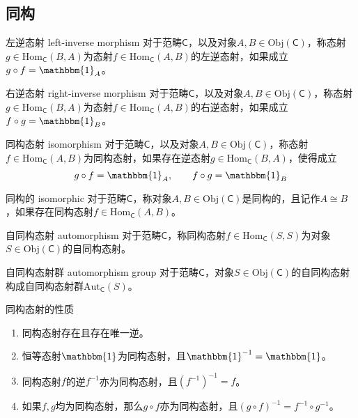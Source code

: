 \subsection{同构}

\begin{definition}{左逆态射 left-inverse morphism}
	对于范畴$\mathsf{C}$，以及对象$A,B\in\mathrm{Obj}(\mathsf{C})$，称态射$g\in\mathrm{Hom}_\mathsf{C}(B,A)$为态射$f\in\mathrm{Hom}_\mathsf{C}(A,B)$的左逆态射，如果成立$g\circ f=\mathbbm{1}_A$。
\end{definition}

\begin{definition}{右逆态射 right-inverse morphism}
	对于范畴$\mathsf{C}$，以及对象$A,B\in\mathrm{Obj}(\mathsf{C})$，称态射$g\in\mathrm{Hom}_\mathsf{C}(B,A)$为态射$f\in\mathrm{Hom}_\mathsf{C}(A,B)$的右逆态射，如果成立$f\circ g=\mathbbm{1}_B$。
\end{definition}

\begin{definition}{同构态射 isomorphism}
	对于范畴$\mathsf{C}$，以及对象$A,B\in\mathrm{Obj}(\mathsf{C})$，称态射$f\in\mathrm{Hom}_\mathsf{C}(A,B)$为同构态射，如果存在逆态射$g\in\mathrm{Hom}_\mathsf{C}(B,A)$，使得成立
	$$
	g\circ f=\mathbbm{1}_A,\qquad f\circ g=\mathbbm{1}_B
	$$
\end{definition}

\begin{definition}{同构的 isomorphic}
	对于范畴$\mathsf{C}$，称对象$A,B\in\mathrm{Obj}(\mathsf{C})$是同构的，且记作$A\cong B$，如果存在同构态射$f\in\mathrm{Hom}_\mathsf{C}(A,B)$。
\end{definition}

\begin{definition}{自同构态射 automorphism}
	对于范畴$\mathsf{C}$，称同构态射$f\in\mathrm{Hom}_\mathsf{C}(S,S)$为对象$S\in\mathrm{Obj}(\mathsf{C})$的自同构态射。
\end{definition}

\begin{definition}{自同构态射群 automorphism group}
	对于范畴$\mathsf{C}$，对象$S\in\mathrm{Obj}(\mathsf{C})$的自同构态射构成自同构态射群$\mathrm{Aut}_\mathsf{C}(S)$。
\end{definition}

\begin{proposition}{同构态射的性质}
	\begin{enumerate}
		\item 同构态射存在且存在唯一逆。
		\item 恒等态射$\mathbbm{1}$为同构态射，且$\mathbbm{1}^{-1}=\mathbbm{1}$。
		\item 同构态射$f$的逆$f^{-1}$亦为同构态射，且$(f^{-1})^{-1}=f$。
		\item 如果$f,g$均为同构态射，那么$g\circ f$亦为同构态射，且$(g\circ f)^{-1}=f^{-1}\circ g^{-1}$。
	\end{enumerate}
\end{proposition}

